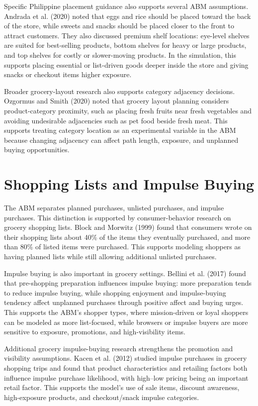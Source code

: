 \documentclass[12pt]{article}
\begin{document}
Specific Philippine placement guidance also supports several ABM assumptions. Andrada et al. (2020) noted that eggs and rice should be placed toward the back of the store, while sweets and snacks should be placed closer to the front to attract customers. They also discussed premium shelf locations: eye-level shelves are suited for best-selling products, bottom shelves for heavy or large products, and top shelves for costly or slower-moving products. In the simulation, this supports placing essential or list-driven goods deeper inside the store and giving snacks or checkout items higher exposure.

Broader grocery-layout research also supports category adjacency decisions. Ozgormus and Smith (2020) noted that grocery layout planning considers product-category proximity, such as placing fresh fruits near fresh vegetables and avoiding undesirable adjacencies such as pet food beside fresh meat. This supports treating category location as an experimental variable in the ABM because changing adjacency can affect path length, exposure, and unplanned buying opportunities.

\section{Shopping Lists and Impulse Buying}

The ABM separates planned purchases, unlisted purchases, and impulse purchases. This distinction is supported by consumer-behavior research on grocery shopping lists. Block and Morwitz (1999) found that consumers wrote on their shopping lists about 40\% of the items they eventually purchased, and more than 80\% of listed items were purchased. This supports modeling shoppers as having planned lists while still allowing additional unlisted purchases.

Impulse buying is also important in grocery settings. Bellini et al. (2017) found that pre-shopping preparation influences impulse buying: more preparation tends to reduce impulse buying, while shopping enjoyment and impulse-buying tendency affect unplanned purchases through positive affect and buying urges. This supports the ABM's shopper types, where mission-driven or loyal shoppers can be modeled as more list-focused, while browsers or impulse buyers are more sensitive to exposure, promotions, and high-visibility items.

Additional grocery impulse-buying research strengthens the promotion and visibility assumptions. Kacen et al. (2012) studied impulse purchases in grocery shopping trips and found that product characteristics and retailing factors both influence impulse purchase likelihood, with high--low pricing being an important retail factor. This supports the model's use of sale items, discount awareness, high-exposure products, and checkout/snack impulse categories.
\end{document}
